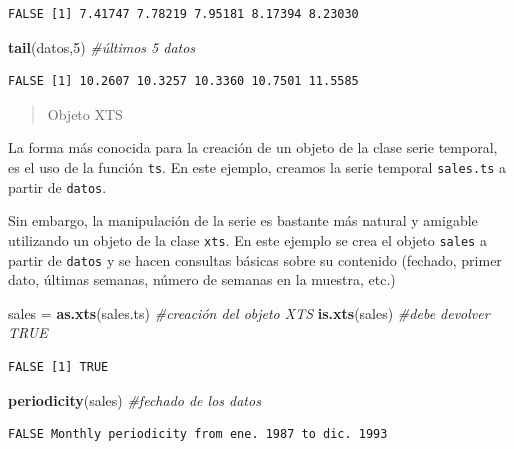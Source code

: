 \documentclass[]{book}
\newenvironment{Shaded}{\begin{snugshade}}{\end{snugshade}}
\newcommand{\CommentTok}[1]{\textcolor[rgb]{0.56,0.35,0.01}{\textit{#1}}}
\newcommand{\DecValTok}[1]{\textcolor[rgb]{0.00,0.00,0.81}{#1}}
\newcommand{\KeywordTok}[1]{\textcolor[rgb]{0.13,0.29,0.53}{\textbf{#1}}}
\newcommand{\NormalTok}[1]{#1}
\newcommand{\StringTok}[1]{\textcolor[rgb]{0.31,0.60,0.02}{#1}}
\begin{document}
\begin{verbatim}
FALSE [1] 7.41747 7.78219 7.95181 8.17394 8.23030
\end{verbatim}

\begin{Shaded}
\begin{Highlighting}[]
\KeywordTok{tail}\NormalTok{(datos,}\DecValTok{5}\NormalTok{) }\CommentTok{#últimos 5 datos}
\end{Highlighting}
\end{Shaded}

\begin{verbatim}
FALSE [1] 10.2607 10.3257 10.3360 10.7501 11.5585
\end{verbatim}

\begin{quote}
Objeto XTS
\end{quote}

La forma más conocida para la creación de un objeto de la clase serie temporal, es el uso de la función \texttt{ts}. En este ejemplo, creamos la serie temporal \texttt{sales.ts} a partir de \texttt{datos}.

Sin embargo, la manipulación de la serie es bastante más natural y amigable utilizando un objeto de la clase \texttt{xts}. En este ejemplo se crea el objeto \texttt{sales} a partir de \texttt{datos} y se hacen consultas básicas sobre su contenido (fechado, primer dato, últimas semanas, número de semanas en la muestra, etc.)

\begin{Shaded}
\begin{Highlighting}[]
\NormalTok{sales =}\StringTok{ }\KeywordTok{as.xts}\NormalTok{(sales.ts) }\CommentTok{#creación del objeto XTS}
\KeywordTok{is.xts}\NormalTok{(sales) }\CommentTok{#debe devolver TRUE}
\end{Highlighting}
\end{Shaded}

\begin{verbatim}
FALSE [1] TRUE
\end{verbatim}

\begin{Shaded}
\begin{Highlighting}[]
\KeywordTok{periodicity}\NormalTok{(sales) }\CommentTok{#fechado de los datos}
\end{Highlighting}
\end{Shaded}

\begin{verbatim}
FALSE Monthly periodicity from ene. 1987 to dic. 1993
\end{verbatim}
\end{document}
